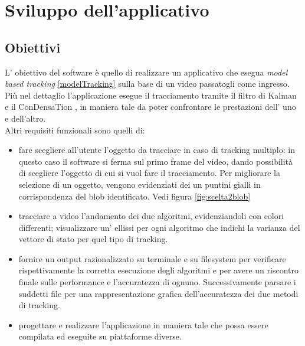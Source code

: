 
\section{Sviluppo dell'applicativo}

\subsection{Obiettivi}
L' obiettivo del software è quello di realizzare un applicativo che esegua \textit{model based tracking} \ref{modelTracking} sulla base di un video passatogli come ingresso. Più nel dettaglio l'applicazione esegue il tracciamento tramite il filtro di Kalman \cite{kalman-intro} e il ConDensaTion \cite{kalman-condense}, in maniera tale da poter confrontare le prestazioni dell' uno e dell'altro.\\
Altri requisiti funzionali sono quelli di:

\begin{itemize}
 \item  fare scegliere all'utente l'oggetto da tracciare in caso di tracking multiplo: in questo caso il software si ferma sul primo frame del video, dando possibilità di scegliere l'oggetto di cui si vuol fare il tracciamento. Per migliorare la selezione di un oggetto, vengono evidenziati dei un puntini gialli in corrispondenza del blob identificato. Vedi figura \ref{fig:scelta2blob}

\item tracciare a video l'andamento dei due algoritmi, evidenziandoli con colori differenti; visualizzare un' ellissi per ogni algoritmo che indichi la varianza del vettore di stato per quel tipo di tracking.

\item fornire un output razionalizzato su terminale e su filesystem per verificare rispettivamente la corretta esecuzione degli algoritmi e per avere un riscontro finale sulle performance e l'accuratezza di ognuno. Successivamente parsare i suddetti file per una rappresentazione grafica dell'accuratezza dei due metodi di tracking.

\item progettare e realizzare l'applicazione in maniera tale che possa essere compilata ed eseguite su piattaforme diverse.


\end{itemize}

